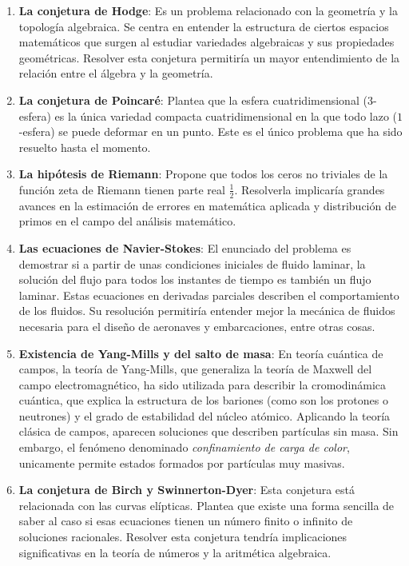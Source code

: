     \begin{enumerate}
        \item \textbf{La conjetura de Hodge}:  Es un problema relacionado con la geometría y la topología algebraica. Se centra en entender la estructura de ciertos espacios matemáticos que surgen al estudiar variedades algebraicas y sus propiedades geométricas. Resolver esta conjetura permitiría un mayor entendimiento de la relación entre el álgebra y la geometría.
        
        \item \textbf{La conjetura de Poincaré}: Plantea que la esfera cuatridimensional ($3$-esfera) es la única variedad compacta cuatridimensional en la que todo lazo ($1$-esfera) se puede deformar en un punto. Este es el único problema que ha sido resuelto hasta el momento.
        
        \item \textbf{La hipótesis de Riemann}: Propone que todos los ceros no triviales de la función zeta de Riemann tienen parte real $\frac{1}{2}$. Resolverla implicaría grandes avances en la estimación de errores en matemática aplicada y distribución de primos en el campo del análisis matemático.

        \item \textbf{Las ecuaciones de Navier-Stokes}: El enunciado del problema es demostrar si a partir de unas condiciones iniciales de fluido laminar, la solución del flujo para todos los instantes de tiempo es también un flujo laminar. Estas ecuaciones en derivadas parciales describen el comportamiento de los fluidos. Su resolución permitiría entender mejor la mecánica de fluidos necesaria para el diseño de aeronaves y embarcaciones, entre otras cosas.
        
        \item \textbf{Existencia de Yang-Mills y del salto de masa}: En teoría cuántica de campos, la teoría de Yang-Mills, que generaliza la teoría de Maxwell del campo electromagnético, ha sido utilizada para describir la cromodinámica cuántica, que explica la estructura de los bariones (como son los protones o neutrones) y el grado de estabilidad del núcleo atómico. Aplicando la teoría clásica de campos, aparecen soluciones que describen partículas sin masa. Sin embargo, el fenómeno denominado \textit{confinamiento de carga de color}, unicamente permite estados formados por partículas muy masivas.
        
        \item \textbf{La conjetura de Birch y Swinnerton-Dyer}:  Esta conjetura está relacionada con las curvas elípticas. Plantea que existe una forma sencilla de saber al caso si esas ecuaciones tienen un número finito o infinito de soluciones racionales. Resolver esta conjetura tendría implicaciones significativas en la teoría de números y la aritmética algebraica.
    \end{enumerate}

